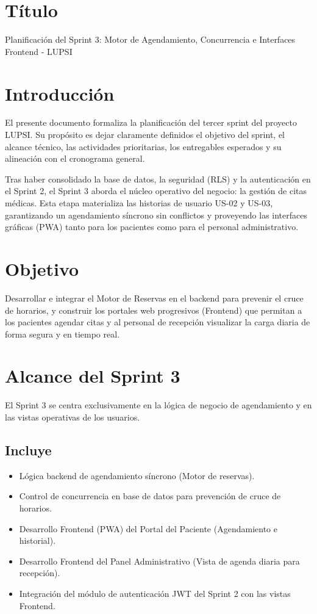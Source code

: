\documentclass[a4paper,12pt]{article}
\begin{document}
\raggedbottom

\section{Título}
Planificación del Sprint 3: Motor de Agendamiento, Concurrencia e Interfaces Frontend - LUPSI

\section{Introducción}
El presente documento formaliza la planificación del tercer sprint del proyecto LUPSI. Su propósito es dejar claramente definidos el objetivo del sprint, el alcance técnico, las actividades prioritarias, los entregables esperados y su alineación con el cronograma general.

Tras haber consolidado la base de datos, la seguridad (RLS) y la autenticación en el Sprint 2, el Sprint 3 aborda el núcleo operativo del negocio: la gestión de citas médicas. Esta etapa materializa las historias de usuario US-02 y US-03, garantizando un agendamiento síncrono sin conflictos y proveyendo las interfaces gráficas (PWA) tanto para los pacientes como para el personal administrativo.

\section{Objetivo}
Desarrollar e integrar el Motor de Reservas en el backend para prevenir el cruce de horarios, y construir los portales web progresivos (Frontend) que permitan a los pacientes agendar citas y al personal de recepción visualizar la carga diaria de forma segura y en tiempo real.

\section{Alcance del Sprint 3}
El Sprint 3 se centra exclusivamente en la lógica de negocio de agendamiento y en las vistas operativas de los usuarios.

\subsection{Incluye}
\begin{itemize}
    \item Lógica backend de agendamiento síncrono (Motor de reservas).
    \item Control de concurrencia en base de datos para prevención de cruce de horarios.
    \item Desarrollo Frontend (PWA) del Portal del Paciente (Agendamiento e historial).
    \item Desarrollo Frontend del Panel Administrativo (Vista de agenda diaria para recepción).
    \item Integración del módulo de autenticación JWT del Sprint 2 con las vistas Frontend.
\end{itemize}
\end{document}
